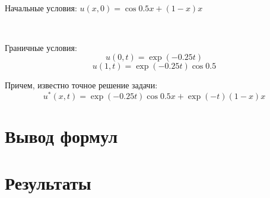 \documentclass[12pt,a4paper]{article}
\begin{document}
\

Начальные условия: $ \displaystyle u(x,0) = \cos 0.5x + (1-x)x$

\

Граничные условия:
$$ u(0,t) = \exp(-0.25t) $$
$$ u(1,t) = \exp(-0.25t) \cos 0.5 $$

Причем, известно точное решение задачи:
$$
 \displaystyle u^*(x,t) = 
 \exp(-0.25t) \cos 0.5x + \exp(-t) (1-x)x
$$

\section{Вывод формул}



\section{Результаты}

\
\end{document}
